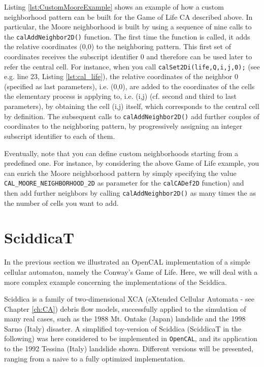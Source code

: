 Listing \ref{lst:CustomMooreExample} shows an example of how a custom
neighborhood pattern can be built for the Game of Life CA described
above. In particular, the Moore neighborhood is built by using a
sequence of nine calls to the \verb'calAddNeighbor2D()' function. The
first time the function is called, it adds the relative coordinates
(0,0) to the neighboring pattern. This first set of coordinates
receives the subscript identifier 0 and therefore can be used later to
refer the central cell. For instance, when you call
\verb'calSet2Di(life,Q,i,j,0);' (see e.g. line 23, Listing
\ref{lst:cal_life}), the relative coordinates of the neighbor 0
(specified as last parameters), i.e. (0,0), are added to the
coordinates of the cells the elementary process is applying to,
i.e. (i,j) (cf. second and third to last parameters), by obtaining the
cell (i,j) itself, which corresponds to the central cell by
definition. The subsequent calls to \verb'calAddNeighbor2D()' add
further couples of coordinates to the neighboring pattern, by
progressively assigning an integer subscript identifier to each of
them.

Eventually, note that you can define custom neighborhoods starting
from a predefined one. For instance, by considering the above
Game of Life example, you can enrich the Moore neighborhood pattern
by simply specifying the value \verb'CAL_MOORE_NEIGHBORHOOD_2D' as
parameter for the \verb'calCADef2D' function) and then add further
neighbors by calling \verb'calAddNeighbor2D()' as many times the as
the number of cells you want to add.

\section{SciddicaT}\label{sec:sciddicaT}
In the previous section we illustrated an OpenCAL implementation of a
simple cellular automaton, namely the Conway’s Game of Life. Here, we
will deal with a more complex example concerning the implementations
of the Sciddica.

Sciddica is a family of two-dimensional XCA (eXtended Cellular
Automata - see Chapter \ref{ch:CA}) debris flow models, successfully
applied to the simulation of many real cases, such as the 1988
Mt. Ontake (Japan) landslide and the 1998 Sarno (Italy) disaster. A
simplified toy-version of Sciddica (SciddicaT in the following) was
here considered to be implemented in \verb"OpenCAL", and its
application to the 1992 Tessina (Italy) landslide shown. Different
versions will be presented, ranging from a naive to a fully optimized
implementation.

